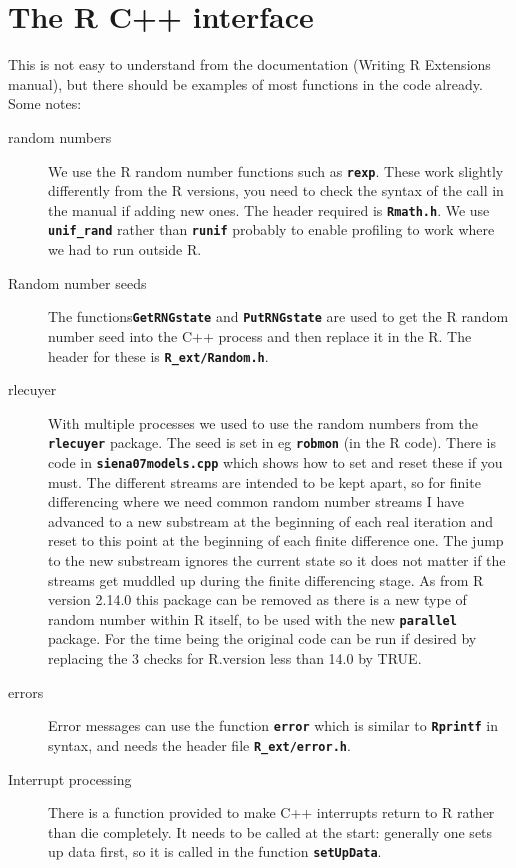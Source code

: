 \documentclass[12pt, a4paper]{article}
\renewcommand{\=}{\,=\,}
\newcommand{\+}{\,+\,}
\newcommand{\sfn}[1]{\textbf{\texttt{#1}}}
\begin{document}
\section{The R C++ interface}
This is not easy to understand from the documentation (Writing R Extensions
manual), but there should be examples of most functions in the code
already. Some notes:
\begin{description}
\item[random numbers]
We use the R random number functions such as \sfn{rexp}. These work slightly
differently from the R versions, you need to check the syntax of the call in
the manual if adding new ones. The header required is \sfn{Rmath.h}. We use
\sfn{unif\_rand} rather than \sfn{runif} probably to enable profiling to
work where we had to run outside R.

\item[Random number seeds] The functions\sfn{GetRNGstate} and
\sfn{PutRNGstate}  are used to get the R random number seed into the C++
process and then replace it in the R. The header for these is
\sfn{R\_ext/Random.h}.
\item[rlecuyer]
With multiple processes we used to use the random numbers from the \sfn{rlecuyer}
package. The seed is set in eg \sfn{robmon} (in the R code). There is code in
\sfn{siena07models.cpp} which shows how to set and reset these if you must. The
different streams are intended to be kept apart, so for finite differencing
where we need common random number streams I have advanced to a new substream at
the beginning of each real iteration and reset to this point at the beginning of
each finite difference one. The jump to the new substream ignores the current
state so it does not matter if the streams get muddled up during the finite
differencing stage. As from R version 2.14.0 this package can be removed as
there is a new type of random number within R itself, to be used with the
new \sfn{parallel} package. For the time being the original code can be run if
desired by replacing the 3 checks for R.version less than 14.0 by TRUE.
\item[errors]
Error messages can use the function \sfn{error} which is similar to
\sfn{Rprintf} in syntax, and needs the header file \sfn{R\_ext/error.h}.
\item[Interrupt processing] There is a function provided to make C++ interrupts
  return to R rather than die completely. It needs to be called at the start:
  generally one sets up data first, so it is called in the function
  \sfn{setUpData}.
\end{description}
\end{document}
